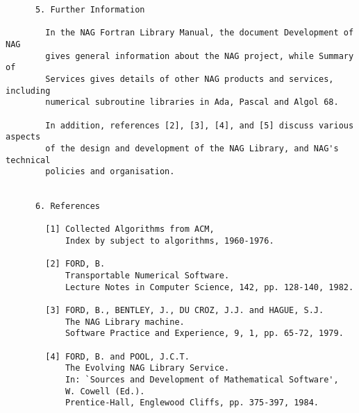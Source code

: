 \begin{small}
\begin{verbatim}
      5. Further Information                                                      
                                                                                  
        In the NAG Fortran Library Manual, the document Development of NAG        
        gives general information about the NAG project, while Summary of         
        Services gives details of other NAG products and services, including      
        numerical subroutine libraries in Ada, Pascal and Algol 68.               
                                                                                  
        In addition, references [2], [3], [4], and [5] discuss various aspects    
        of the design and development of the NAG Library, and NAG's technical     
        policies and organisation.                                                
                                                                                  
                                                                                  
      6. References                                                               
                                                                                  
        [1] Collected Algorithms from ACM,                                        
            Index by subject to algorithms, 1960-1976.                            
                                                                                  
        [2] FORD, B.                                                              
            Transportable Numerical Software.                                     
            Lecture Notes in Computer Science, 142, pp. 128-140, 1982.            
                                                                                  
        [3] FORD, B., BENTLEY, J., DU CROZ, J.J. and HAGUE, S.J.                  
            The NAG Library machine.                                              
            Software Practice and Experience, 9, 1, pp. 65-72, 1979.              
                                                                                  
        [4] FORD, B. and POOL, J.C.T.                                             
            The Evolving NAG Library Service.                                     
            In: `Sources and Development of Mathematical Software',               
            W. Cowell (Ed.).                                                      
            Prentice-Hall, Englewood Cliffs, pp. 375-397, 1984.                   
                                                                                  

\end{verbatim}
\end{small}
